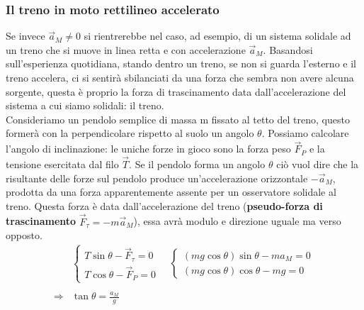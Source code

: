 \subsubsection*{Il treno in moto rettilineo accelerato}
Se invece $\vec{a}_M \neq 0$ si  rientrerebbe nel caso, ad esempio, di un sistema solidale ad un treno che si muove in linea retta e con accelerazione $\vec{a}_M$. Basandosi sull'esperienza quotidiana, stando dentro un treno, se non si guarda l'esterno e il treno accelera, ci si sentirà sbilanciati da una forza che sembra non avere alcuna sorgente, questa è proprio la forza di trascinamento data dall'accelerazione del sistema a cui siamo solidali: il treno.\\
Consideriamo un pendolo semplice di massa m fissato al tetto del treno, questo formerà con la perpendicolare rispetto al suolo un angolo $\theta$. Possiamo calcolare l'angolo di inclinazione: le uniche forze in gioco sono la forza peso $\vec{F}_P$ e la tensione esercitata dal filo $\vec{T}$. Se il pendolo forma un angolo $\theta$ ciò vuol dire che la risultante delle forze sul pendolo produce un'accelerazione orizzontale $-\vec{a}_M$, prodotta da una forza apparentemente assente per un osservatore solidale al treno. Questa forza è data dall'accelerazione del treno (\textbf{pseudo-forza di trascinamento} $\vec{F}_\tau=-m\vec{a}_M$), essa avrà modulo e direzione uguale ma verso opposto. 
\begin{align*}
&\begin{cases}
	T\sin\theta-\vec{F}_\tau=0\\
	T\cos\theta-\vec{F}_P=0
\end{cases}\quad
\begin{cases}
	(mg\cos\theta)\sin\theta-ma_M=0\\
	(mg\cos\theta)\cos\theta-mg=0
\end{cases}\\\\
\Rightarrow &\tan\theta=\frac{a_M}{g}
\end{align*}
